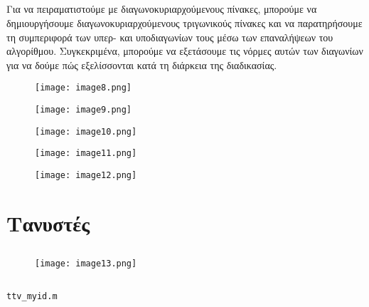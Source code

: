\documentclass[12pt,a4paper]{article}
\begin{document}
\subsection{}
Για να πειραματιστούμε με διαγωνοκυριαρχούμενους πίνακες, μπορούμε να δημιουργήσουμε διαγωνοκυριαρχούμενους τριγωνικούς πίνακες και να παρατηρήσουμε τη συμπεριφορά των υπερ- και υποδιαγωνίων τους μέσω των επαναλήψεων του αλγορίθμου. Συγκεκριμένα, μπορούμε να εξετάσουμε τις νόρμες αυτών των διαγωνίων για να δούμε πώς εξελίσσονται κατά τη διάρκεια της διαδικασίας.
\begin{figure}[h]
\centering
\texttt{[image: image8.png]} 
\label{fig:image9}
\end{figure}
\begin{figure}[h]
\centering
\texttt{[image: image9.png]} 
\label{fig:image10}
\end{figure}
\begin{figure}[h]
\centering
\texttt{[image: image10.png]} 
\label{fig:image11}
\end{figure}
\begin{figure}[h]
\centering
\texttt{[image: image11.png]} 
\label{fig:image12}
\end{figure}
\begin{figure}[h]
\centering
\texttt{[image: image12.png]} 
\label{fig:image13}
\end{figure}
\FloatBarrier %

\section{Τανυστές}
\subsection{}
\begin{figure}[h]
\centering
\texttt{[image: image13.png]} 
\label{fig:image14}
\end{figure}
\FloatBarrier %
\subsection{}
  \texttt{ttv\_myid.m}\\
\end{document}
